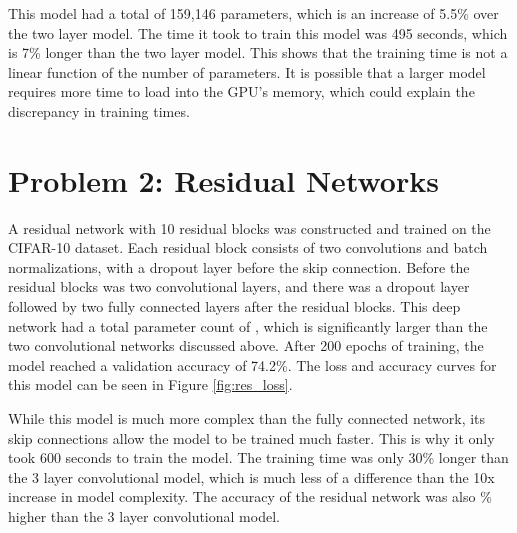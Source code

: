 \documentclass{article}
\begin{document}
\begin{enumerate}[label=\alph*. ]
     This model had a total of 159,146 parameters, which is an increase of 5.5\% over the two layer model. The time it took to train this model was 495 seconds, which is 7\% longer than the two layer model. This shows that the training time is not a linear function of the number of parameters. It is possible that a larger model requires more time to load into the GPU's memory, which could explain the discrepancy in training times.

\end{enumerate}
\section{Problem 2: Residual Networks}
A residual network with 10 residual blocks was constructed and trained on the CIFAR-10 dataset. Each residual block consists of two convolutions and batch normalizations, with a dropout layer before the skip connection. Before the residual blocks was two convolutional layers, and there was a dropout layer followed by two fully connected layers after the residual blocks. This deep network had a total parameter count of , which is significantly larger than the two convolutional networks discussed above. After 200 epochs of training, the model reached a validation accuracy of 74.2\%. The loss and accuracy curves for this model can be seen in Figure \ref{fig:res_loss}.

While this model is much more complex than the fully connected network, its skip connections allow the model to be trained much faster. This is why it only took 600 seconds to train the model. The training time was only 30\% longer than the 3 layer convolutional model, which is much less of a difference than the 10x increase in model complexity. The accuracy of the residual network was also \% higher than the 3 layer convolutional model.
\end{document}
